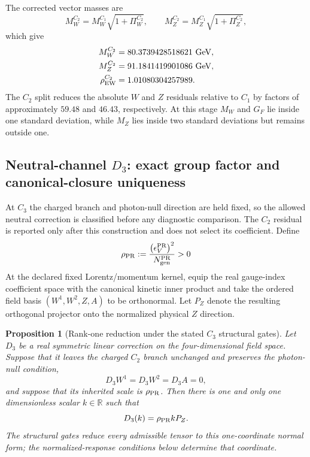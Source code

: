 \documentclass[11pt]{article}
\newtheorem{proposition}[theorem]{Proposition}
\begin{document}
The corrected vector masses are
\begin{equation}
M_W^{C_2}
=
M_W^{C_1}\sqrt{1+\Pi_W^{C_2}},
\qquad
M_Z^{C_2}
=
M_Z^{C_1}\sqrt{1+\Pi_Z^{C_2}},
\end{equation}
which give
\begin{align}
M_W^{C_2}
&=
80.3739428518621\ {\rm GeV},
\\
M_Z^{C_2}
&=
91.1841419901086\ {\rm GeV},
\\
\rho_{\rm EW}^{C_2}
&=
1.01080304257989 .
\end{align}
The \(C_2\) split reduces the absolute \(W\) and \(Z\) residuals relative to \(C_1\) by factors of approximately \(59.48\) and \(46.43\), respectively.  At this stage \(M_W\) and \(G_F\) lie inside one standard deviation, while \(M_Z\) lies inside two standard deviations but remains outside one.

\subsection{Neutral-channel \(D_3\): exact group factor and canonical-closure uniqueness}
\label{subsec:priii-ew-C3-neutral-refinement}

At \(C_3\) the charged branch and photon-null direction are held fixed, so the allowed neutral correction is classified before any diagnostic comparison. The \(C_2\) residual is reported only after this construction and does not select its coefficient.  Define
\begin{equation}
\rho_{\rm PR}
:=
\frac{\left(\epsilon_V^{\rm PR}\right)^2}
{N_{\rm gen}^{\rm PR}}
>0
\label{eq:priii-rho-pr-definition}
\end{equation}
At the declared fixed Lorentz/momentum kernel, equip the real gauge-index coefficient space with the canonical kinetic inner product and take the ordered field basis \((W^1,W^2,Z,A)\) to be orthonormal.  Let \(P_Z\) denote the resulting orthogonal projector onto the normalized physical
\(Z\) direction.

\begin{proposition}[Rank-one reduction under the stated \(C_3\) structural gates] \label{prop:priii-d3-structural-classification}
Let \(D_3\) be a real symmetric linear correction on the four-dimensional field space.  Suppose that it leaves the charged \(C_2\) branch unchanged and preserves the photon-null condition,
\begin{equation}
D_3W^1=D_3W^2=D_3A=0,
\label{eq:priii-d3-structural-gates}
\end{equation}
and suppose that its inherited scale is \(\rho_{\rm PR}\).  Then there is one and only one
dimensionless scalar \(k\in\mathbb R\) such that
\begin{equation}
D_3(k)=\rho_{\rm PR}kP_Z.
\label{eq:priii-d3-fixed-kernel-family}
\end{equation}
The structural gates reduce every admissible tensor to this one-coordinate
normal form; the normalized-response conditions below determine that
coordinate.
\end{proposition}
\end{document}
